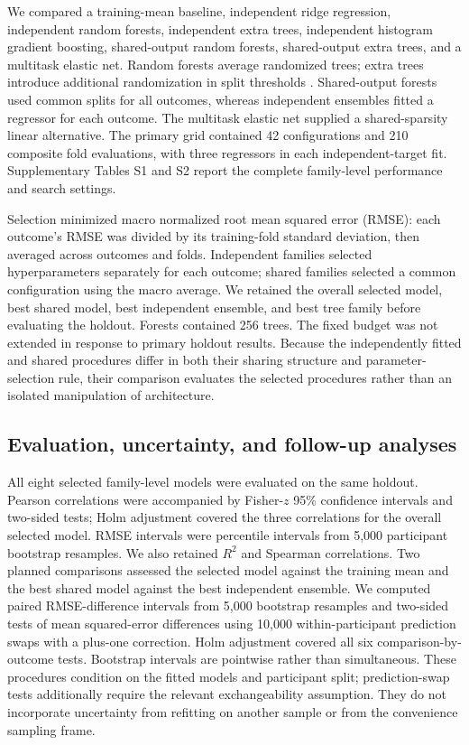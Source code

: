 We compared a training-mean baseline, independent ridge regression, independent random forests, independent extra trees, independent histogram gradient boosting, shared-output random forests, shared-output extra trees, and a multitask elastic net. Random forests average randomized trees; extra trees introduce additional randomization in split thresholds \citep{breiman2001,geurts2006}. Shared-output forests used common splits for all outcomes, whereas independent ensembles fitted a regressor for each outcome. The multitask elastic net supplied a shared-sparsity linear alternative. The primary grid contained 42 configurations and 210 composite fold evaluations, with three regressors in each independent-target fit. Supplementary Tables S1 and S2 report the complete family-level performance and search settings.

Selection minimized macro normalized root mean squared error (RMSE): each outcome's RMSE was divided by its training-fold standard deviation, then averaged across outcomes and folds. Independent families selected hyperparameters separately for each outcome; shared families selected a common configuration using the macro average. We retained the overall selected model, best shared model, best independent ensemble, and best tree family before evaluating the holdout. Forests contained 256 trees. The fixed budget was not extended in response to primary holdout results. Because the independently fitted and shared procedures differ in both their sharing structure and parameter-selection rule, their comparison evaluates the selected procedures rather than an isolated manipulation of architecture.

\subsection{Evaluation, uncertainty, and follow-up analyses}
All eight selected family-level models were evaluated on the same holdout. Pearson correlations were accompanied by Fisher-$z$ 95\% confidence intervals and two-sided tests; Holm adjustment covered the three correlations for the overall selected model. RMSE intervals were percentile intervals from 5,000 participant bootstrap resamples. We also retained $R^2$ and Spearman correlations. Two planned comparisons assessed the selected model against the training mean and the best shared model against the best independent ensemble. We computed paired RMSE-difference intervals from 5,000 bootstrap resamples and two-sided tests of mean squared-error differences using 10,000 within-participant prediction swaps with a plus-one correction. Holm adjustment covered all six comparison-by-outcome tests. Bootstrap intervals are pointwise rather than simultaneous. These procedures condition on the fitted models and participant split; prediction-swap tests additionally require the relevant exchangeability assumption. They do not incorporate uncertainty from refitting on another sample or from the convenience sampling frame.

